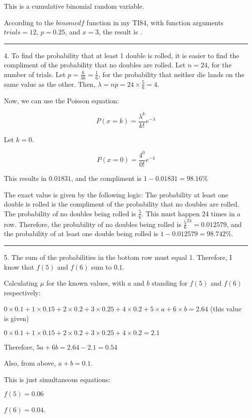 \documentclass{article}
\begin{document}
This is a cumulative binomial random variable. 

According to the $binomcdf$ function in my TI84, with function arguments $trials = 12$, $p = 0.25$, and $x = 3$, the result is . 

\noindent\rule{8cm}{0.4pt}


4. To find the probability that at least 1 double is rolled, it is easier to find the compliment of the probability that no doubles are rolled. Let $n = 24$, for the number of trials. Let $p = \frac{6}{36} = \frac{1}{6}$, for the probability that neither die lands on the same value as the other. Then, $\lambda = np = 24 \times \frac{5}{6} = 4$. 

Now, we can use the Poisson equation:

\begin{equation}
P(x=k) = \frac{\lambda ^ k}{k!} e^{-\lambda}
\end{equation}

Let $k = 0$. 


\[P(x=0) = \frac{4 ^ 0}{0!} e^{-4}\]

This results in $0.01831$, and the compliment is $1-0.01831 = 98.16\%$



The exact value is given by the following logic:
The probability at least one double is rolled is the compliment of the probability that no doubles are rolled. The probability of no doubles being rolled is $\frac{5}{6}$. This must happen 24 times in a row. Therefore, the probability of no doubles being rolled is $\frac{5}{6}^{24} = 0.012579$, and the probability of at least one double being rolled is $1 - 0.012579 = \boxed{98.742\%}$.  

\noindent\rule{8cm}{0.4pt}


5. The sum of the probabilities in the bottom row must equal 1. Therefore, I know that $f(5)$ and $f(6)$ sum to $0.1$. 

Calculating $\mu$ for the known values, with $a$ and $b$ standing for $f(5)$ and $f(6)$ respectively:

$0\times0.1 + 1\times0.15 + 2\times0.2 + 3\times0.25+4\times0.2 + 5\times a + 6\times b = 2.64 $ (this value is given)

$0\times0.1 + 1\times0.15 + 2\times0.2 + 3\times0.25+4\times0.2  = 2.1 $ 

Therefore, $5a + 6b = 2.64 - 2.1 = 0.54$

Also, from above, $a+b=0.1$. 

This is just simultaneous equations: 


$f(5) = \boxed{0.06}$

$f(6) = \boxed{0.04}$.
























 
\end{document}
